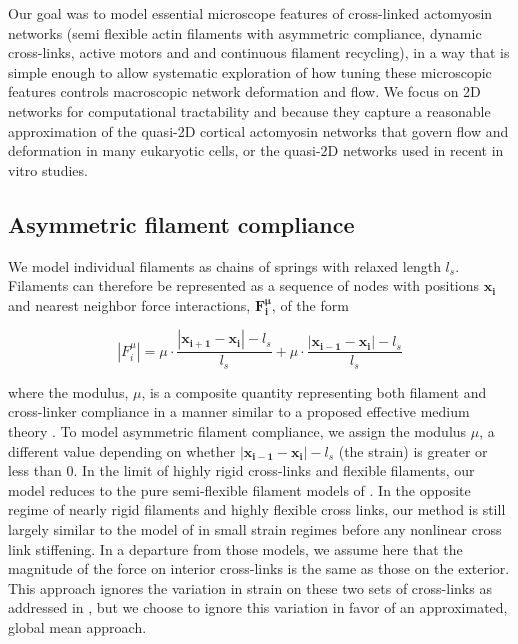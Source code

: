 \documentclass[10pt,letterpaper]{article}
\begin{document}
Our goal was to model essential microscope features of cross-linked actomyosin networks (semi flexible actin filaments with asymmetric compliance, dynamic cross-links, active motors and and continuous filament recycling), in a way that is simple enough to allow systematic exploration of how tuning these microscopic features controls macroscopic network deformation and flow. We focus on 2D networks for computational tractability and because they capture a reasonable approximation of the quasi-2D cortical actomyosin networks that govern flow and deformation in many eukaryotic cells\cite{cellmech_flows}, or the quasi-2D networks used in recent in vitro studies\cite{rheo_2D1,rheo_2D2}.


\subsection*{Asymmetric filament compliance}
We model individual filaments as chains of springs with relaxed length $l_s$.  Filaments can therefore be represented as a sequence of nodes with positions $\mathbf{x_i}$ and nearest neighbor force interactions, $\mathbf{F^{\mu}_i}$, of the form

\begin{equation}
\label{eqn:spring}
|F^{\mu}_i| = \mu\cdot\frac{|\mathbf{x_{i+1}}-\mathbf{x_i}|-l_s}{l_s} +\mu\cdot\frac{|\mathbf{x_{i-1}}-\mathbf{x_i}|-l_s}{l_s}
\end{equation}





where the modulus, $\mu$, is a composite quantity representing both filament and cross-linker compliance in a manner similar to a proposed effective medium theory \cite{theo_crosslinknonlinear}.   To model asymmetric filament compliance, we assign the modulus $\mu$, a different value depending on whether $|\mathbf{x_{i-1}}-\mathbf{x_i}|-l_s$ (the strain) is greater or less than 0. In the limit of highly rigid cross-links and flexible filaments, our model reduces to the pure semi-flexible filament models of \cite{theo_hlm,theo_hlm2}.  In the opposite regime of nearly rigid filaments and highly flexible cross links, our method is still largely similar to the model of \cite{theo_crosslinknonlinear} in small strain regimes before any nonlinear cross link stiffening.  In a departure from those models, we assume here that the magnitude of the force on interior cross-links is the same as those on the exterior.  This approach ignores the variation in strain on these two sets of cross-links as addressed in \cite{theo_crosslinknonlinear}, but we choose to ignore this variation in favor of an approximated, global mean approach.  
\end{document}
